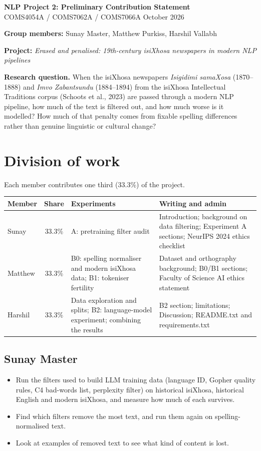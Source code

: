 \documentclass[11pt,a4paper]{article}
\begin{document}
{\centering
{\Large\textbf{NLP Project 2: Preliminary Contribution Statement}}\\[0.3em]
COMS4054A / COMS7062A / COMS7066A \quad\textbullet{} October 2026\\[0.8em]
}

\textbf{Group members:} Sunay Master, Matthew Purkiss, Harshil Vallabh

\textbf{Project:} \emph{Erased and penalised: 19th-century isiXhosa newspapers in modern NLP pipelines}

\textbf{Research question.} When the isiXhosa newspapers \emph{Isigidimi samaXosa} (1870--1888) and
\emph{Imvo Zabantsundu} (1884--1894) from the isiXhosa Intellectual Traditions corpus
(Schoots et al., 2023) are passed through a modern NLP pipeline, how much of the text is filtered
out, and how much worse is it modelled? How much of that penalty comes from fixable spelling
differences rather than genuine linguistic or cultural change?

\section*{Division of work}

Each member contributes one third (33.3\%) of the project.

\begin{tabularx}{\textwidth}{@{}l c >{\raggedright\arraybackslash}X >{\raggedright\arraybackslash}X@{}}
\toprule
\textbf{Member} & \textbf{Share} & \textbf{Experiments} & \textbf{Writing and admin} \\
\midrule
Sunay   & 33.3\% & A: pretraining filter audit
        & Introduction; background on data filtering; Experiment A sections; NeurIPS 2024 ethics checklist \\
Matthew & 33.3\% & B0: spelling normaliser and modern isiXhosa data; B1: tokeniser fertility
        & Dataset and orthography background; B0/B1 sections; Faculty of Science AI ethics statement \\
Harshil & 33.3\% & Data exploration and splits; B2: language-model experiment; combining the results
        & B2 section; limitations; Discussion; README.txt and requirements.txt \\
\bottomrule
\end{tabularx}

\subsection*{Sunay Master}
\begin{itemize}
  \item Run the filters used to build LLM training data (language ID, Gopher quality rules, C4
        bad-words list, perplexity filter) on historical isiXhosa, historical English and modern
        isiXhosa, and measure how much of each survives.
  \item Find which filters remove the most text, and run them again on spelling-normalised text.
  \item Look at examples of removed text to see what kind of content is lost.
\end{itemize}
\end{document}
